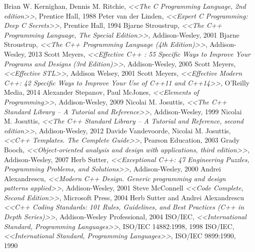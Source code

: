 \documentclass[a4paper,12pt,oneside]{article}
\begin{document}
\pagebreak
{}
{}
\listoffigures

\pagebreak
{}
\begin{thebibliography}{99}
 Brian W. Kernighan, Dennis M. Ritchie, \textit{<<The C Programming Language, 2nd edition>>}, Prentice Hall, 1988
 Peter van der Linden, \textit{<<Expert C Programming: Deep C Secrets>>}, Prentice Hall, 1994
 Bjarne Stroustrup, \textit{<<The C++ Programming Language, The Special Edition>>}, Addison-Wesley, 2001
 Bjarne Stroustrup, \textit{<<The C++ Programming Language (4th Edition)>>}, Addison-Wesley, 2013
 Scott Meyers, \textit{<<Effective C++ : 55 Specific Ways to Improve Your Programs and Designs (3rd Edition)>>}, Addison-Wesley, 2005
 Scott Meyers, \textit{<<Effective STL>>}, Addison Welsey, 2001
 Scott Meyers, \textit{<<Effective Modern C++: 42 Specific Ways to Improve Your Use of C++11 and C++14>>}, O'Reilly Media, 2014
 Alexander Stepanov, Paul McJones, \textit{<<Elements of Programming>>}, Addison-Wesley, 2009
 Nicolai M. Josuttis, \textit{<<The C++ Standard Library -- A Tutorial and Reference>>}, Addison-Wesley, 1999
 Nicolai M. Josuttis, \textit{<<The C++ Standard Library -- A Tutorial and Reference, second edition>>}, Addison-Wesley, 2012
 Davide Vandevoorde, Nicolai M. Josuttis, \textit{<<C++ Templates. The Complete Guide>>}, Pearson Education, 2003
 Grady Booch, \textit{<<Object-oriented analysis and design with applications, third edition>>}, Addison-Wesley, 2007
 Herb Sutter, \textit{<<Exceptional C++: 47 Engineering Puzzles, Programming Problems, and Solutions>>}, Addison-Wesley, 2000
 Andrei Alexandrescu, \textit{<<Modern C++ Design. Generic programming and design patterns applied>>}, Addison-Wesley, 2001
 Steve McConnell \textit{<<Code Complete, Second Edition>>}, Microsoft Press, 2004
 Herb Sutter and Andrei Alexandrescu \textit{<<C++ Coding Standards: 101 Rules, Guidelines, and Best Practices (C++ in Depth Series)>>}, Addison-Wesley Professional, 2004
 ISO/IEC, \textit{<<International Standard, Programming Languages>>}, ISO/IEC 14882:1998, 1998
 ISO/IEC, \textit{<<International Standard, Programming Languages>>}, ISO/IEC 9899:1990, 1990

\end{thebibliography}
\end{document}
